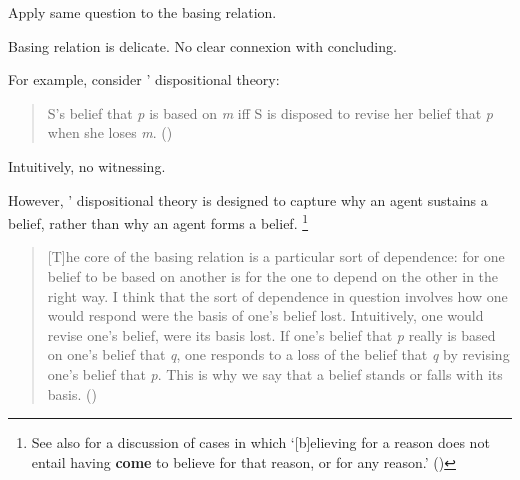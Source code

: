 \begin{note}
  Apply same question to the basing relation.
\end{note}

\begin{note}
  Basing relation is delicate.
  No clear connexion with concluding.

  For example, consider \citeauthor{Evans:2013tw}' dispositional theory:

  \begin{quote}
    S's belief that \emph{p} is based on \emph{m} iff S is disposed to revise her belief that \emph{p} when she loses \emph{m}.%
    \mbox{}\hfill\mbox{(\citeyear[2952]{Evans:2013tw})}
  \end{quote}

  Intuitively, no witnessing.

  However, \citeauthor{Evans:2013tw}' dispositional theory is designed to capture why an agent sustains a belief, rather than why an agent forms a belief.%
  \footnote{
    See also \textcite{Audi:1986to} for a discussion of cases in which `[b]elieving for a reason does not entail having \textbf{come} to believe for that reason, or for any reason.' (\citeyear[32--33]{Audi:1986to})
  }

  \begin{quote}
    [T]he core of the basing relation is a particular sort of dependence:
    for one belief to be based on another is for the one to depend on the other in the right way.
    I think that the sort of dependence in question involves how one would respond were the basis of one's belief lost.
    Intuitively, one would revise one's belief, were its basis lost.
    If one's belief that \emph{p} really is based on one's belief that \emph{q}, one responds to a loss of the belief that \emph{q} by revising one's belief that \emph{p}.
    This is why we say that a belief stands or falls with its basis.%
    \mbox{}\hfill\mbox{(\citeyear[2951]{Evans:2013tw})}
  \end{quote}
\end{note}

